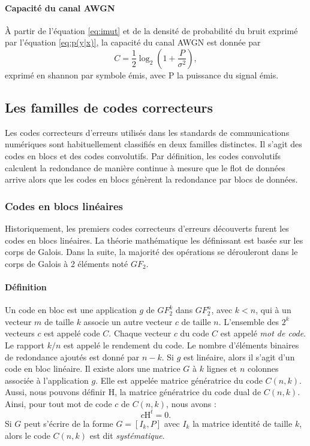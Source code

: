 \paragraph*{Capacité du canal AWGN}
À partir de l'équation \ref{eq:imut} et de la densité de probabilité du bruit exprimé par l'équation \ref{eq:p(y|x)}, la 
capacité du canal AWGN est donnée par \begin{equation}\label{eq:capacity}
C = \frac{1}{2} \log_2\left(1 + \frac{P}{\sigma^2}\right),
\end{equation}
exprimé en shannon par symbole émis, avec P la puissance du signal émis.

\subsection{Les familles de codes correcteurs}
Les codes correcteurs d'erreurs utilisés dans les standards de communications numériques 
sont habituellement classifiés en deux familles distinctes. Il s'agit des codes en blocs et des codes convolutifs. Par définition, 
les codes convolutifs calculent la redondance de manière continue à mesure que le flot de données arrive alors que les codes en blocs génèrent la redondance par blocs de données.
\subsubsection{Codes en blocs linéaires}
Historiquement, les premiers codes correcteurs d'erreurs découverts furent les codes en blocs linéaires. La théorie 
mathématique les définissant est basée sur les corps de Galois. Dans la suite, la majorité des opérations se dérouleront 
dans le corps de Galois à 2 éléments noté $GF_2$.\vspace*{-1em}
\paragraph*{Définition}
Un code en bloc est une application $g$ de $GF_2^k$ dans $GF_2^n$, avec $k<n$, qui à un vecteur $m$ de taille $k$ associe
un autre vecteur $c$ de taille $n$. L'ensemble des $2^k$ vecteurs $c$ est appelé code $C$. Chaque vecteur $c$ du code $C$ est appelé \textit{mot de code}. 
Le rapport $k/n$  est appelé le 
rendement du code. Le nombre d'éléments binaires de redondance ajoutés est donné par $n-k$. Si $g$ est linéaire, alors 
il s'agit d'un code en bloc linéaire. Il existe alors une matrice $G$ à $k$ lignes et $n$ colonnes associée à 
l'application $g$. Elle est appelée matrice génératrice du code $C(n,k)$. \\
Aussi, nous pouvons définir $\text{H}$, la matrice génératrice du code dual de $C(n,k)$. Ainsi, pour tout mot de code $c$ de 
$C(n,k)$, nous avons : \[c\text{H}^t = 0.\]
Si $G$ peut s'écrire de la forme $G=[I_k,P]$ avec $I_k$ la matrice identité de taille $k$, alors  le code $C(n,k)$ est dit
\emph{systématique}.
